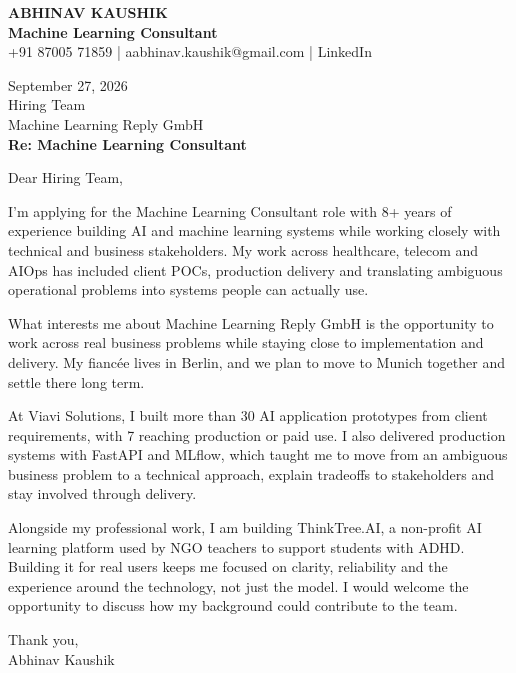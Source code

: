 \documentclass[10pt,a4paper]{article}
\begin{document}
\begin{center}
{\Large\bfseries ABHINAV KAUSHIK}\\[2pt]
{\bfseries Machine Learning Consultant}\\[2pt]
+91 87005 71859 \quad | \quad aabhinav.kaushik@gmail.com \quad | \quad LinkedIn
\end{center}
\vspace{8pt}
September 27, 2026\\[6pt]
Hiring Team\\
Machine Learning Reply GmbH\\[4pt]
\textbf{Re: Machine Learning Consultant}

Dear Hiring Team,

I’m applying for the Machine Learning Consultant role with 8+ years of experience building AI and machine learning systems while working closely with technical and business stakeholders. My work across healthcare, telecom and AIOps has included client POCs, production delivery and translating ambiguous operational problems into systems people can actually use.

What interests me about Machine Learning Reply GmbH is the opportunity to work across real business problems while staying close to implementation and delivery. My fiancée lives in Berlin, and we plan to move to Munich together and settle there long term.

At Viavi Solutions, I built more than 30 AI application prototypes from client requirements, with 7 reaching production or paid use. I also delivered production systems with FastAPI and MLflow, which taught me to move from an ambiguous business problem to a technical approach, explain tradeoffs to stakeholders and stay involved through delivery.

Alongside my professional work, I am building ThinkTree.AI, a non-profit AI learning platform used by NGO teachers to support students with ADHD. Building it for real users keeps me focused on clarity, reliability and the experience around the technology, not just the model. I would welcome the opportunity to discuss how my background could contribute to the team.

Thank you,\\
Abhinav Kaushik
\end{document}
